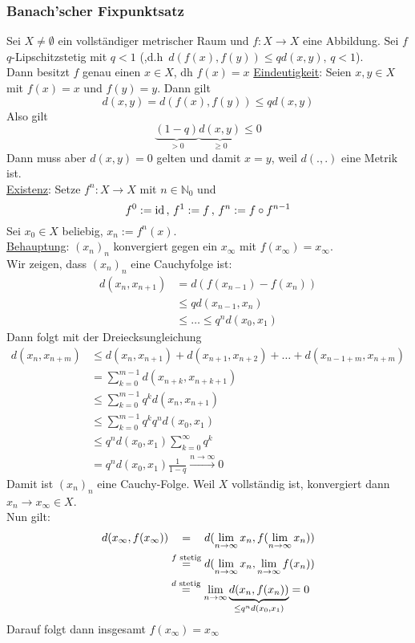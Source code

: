 \subsubsection{Banach'scher Fixpunktsatz} %
\label{ssub:banach_scher_fixpunktsatz}
Sei $X \neq \emptyset$ ein vollständiger metrischer Raum und $f: X \to X$ eine Abbildung. Sei $f$ $q$-Lipschitzstetig mit $q<1$ (,d.h \,$d(f(x),f(y))\leq q d(x,y),\,q <1$). \\
Dann besitzt $f$ genau einen  $x \in X$, dh $f(x)=x$ 
 \underline{Eindeutigkeit}: Seien $x,y \in X$ mit $f(x)=x$ und $f(y)=y$. Dann gilt
\[
	d(x,y)=d(f(x),f(y))\leq q d(x,y)
\]
Also gilt \[
	\underset{>0}{\underbrace{(1-q)}} \underset{\geq 0}{\underbrace{d(x,y)}} \leq 0
\]
Dann muss aber $d(x,y)=0$ gelten und damit $x=y$, weil $d(.,.)$ eine Metrik ist. \\
\underline{Existenz}: Setze $f^n:X \to X$ mit $n \in \mathbb{N}_0$ und
\[
	f^0 := \operatorname{id} \,,\, f^1 := f \,,\,f^n:= f \circ f^{n-1}
\]
Sei $x_0 \in X$ beliebig, $x_n := f^n(x)$.\\
\underline{Behauptung}: $(x_n)_n$ konvergiert gegen ein $x_{\infty}$ mit $f(x_{\infty})=x_{\infty}$. \\
Wir zeigen, dass $(x_n)_n$ eine Cauchyfolge ist: \\
\begin{align*}
	d(x_n,x_{n+1}) &= d(f(x_{n-1})-f(x_n)) \\
	&\leq q d(x_{n-1},x_n) \\
	&\leq \dots \leq q^nd(x_0,x_1) 
\end{align*} 
Dann folgt mit der Dreiecksungleichung
\begin{align*}
	d(x_n,x_{n+m}) &\leq d(x_n,x_{n+1})+d(x_{n+1},x_{n+2})+ \dots + d(x_{n-1+m},x_{n+m}) \\
	&= \sum_{k=0}^{m-1}d(x_{n+k},x_{n+k+1}) \\
	& \leq \sum_{k=0}^{m-1}q^kd(x_n,x_{n+1}) \\
	&\leq \sum_{k=0}^{m-1}q^kq^nd(x_0,x_1) \\
	&\leq q^n d(x_0,x_1)\sum_{k=0}^{\infty}q^k \\
	&= q^n d(x_0,x_1) \frac{1}{1-q} \stackrel{n \to \infty}{\longrightarrow} 0 
\end{align*}
Damit ist $(x_n)_n$ eine Cauchy-Folge. Weil $X$ vollständig ist, konvergiert dann $x_n \to x_{\infty} \in X$. \\
Nun gilt: \begin{align*}
	d(x_{\infty},f(x_{\infty})) &\stackrel{\hphantom{f \text{ stetig}}}{=} d (\lim_{n \to \infty}x_n, f( \lim_{n \to \infty}x_n)) \\
	&\stackrel{f \text{ stetig}}{=} d(\lim_{n \to \infty}x_n, \lim_{n \to \infty}f(x_n)) \\
	&\stackrel{d \text{ stetig}}{=} \lim_{n \to \infty}\underset{\leq q^n d(x_0,x_1)}{\underbrace{d(x_n,f(x_n))}}=0
\end{align*}
Darauf folgt dann insgesamt $f(x_{\infty})=x_{\infty}$ \bewende
